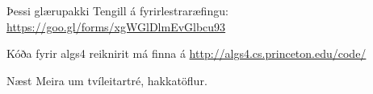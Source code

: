 \documentclass{beamer}
\begin{document}
\begin{frame}{Þessi glærupakki}
Tengill á fyrirlestraræfingu: \url{https://goo.gl/forms/xgWGlDlmEvGlbcu93}
\vspace{1cm}

Kóða fyrir algs4 reiknirit má finna á \url{http://algs4.cs.princeton.edu/code/}
\end{frame}

\begin{frame}{Næst}
Meira um tvíleitartré, hakkatöflur.
\end{frame}
\end{document}

